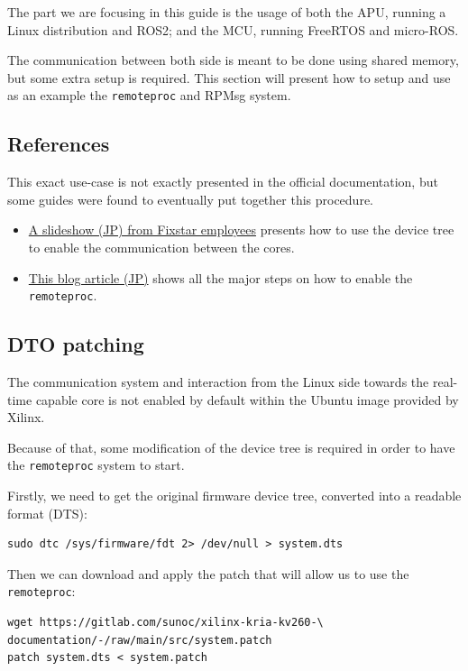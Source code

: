 \documentclass[10pt]{article}
\begin{document}
The part we are focusing in this guide is the usage of both the APU, running
a Linux distribution and ROS2; and the MCU, running FreeRTOS and micro-ROS.

The communication between both side is meant to be done using shared memory, but
some extra setup is required.
This section will present how to setup and use as an example the \verb|remoteproc|
and RPMsg system.

\subsection{References}
\label{sec:referances}
This exact use-case is not exactly presented in the official documentation, but some
guides were found to eventually put together this procedure.

\begin{itemize}
\item \href{https://speakerdeck.com/fixstars/fpga-seminar-12-fixstars-corporation-20220727}{A slideshow (JP) from Fixstar employees} presents how
  to use the device tree to enable the communication between the cores.
\item \href{https://zenn.dev/ryuz88/articles/kv260_setup_memo_ubuntu22}{This blog article (JP)} shows all the major steps on how to enable the \verb|remoteproc|.
\end{itemize}


\subsection{DTO patching}
\label{sec:dto-patching}
The communication system and interaction from the Linux side towards the real-time capable core
is not enabled by default within the Ubuntu image provided by Xilinx.

Because of that, some modification of the device tree is required in order to have
the \verb|remoteproc| system to start.

Firstly, we need to get the original firmware device tree, converted
into a readable format (DTS):
\begin{tcolorbox}
\begin{verbatim}
sudo dtc /sys/firmware/fdt 2> /dev/null > system.dts
\end{verbatim}
\end{tcolorbox}

Then we can download and apply the patch that will allow us to use the \verb|remoteproc|:
\begin{tcolorbox}
\begin{verbatim}
wget https://gitlab.com/sunoc/xilinx-kria-kv260-\
documentation/-/raw/main/src/system.patch
patch system.dts < system.patch
\end{verbatim}
\end{tcolorbox}
\end{document}
